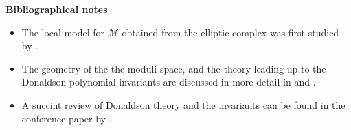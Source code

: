 \textbf{Bibliographical notes}
{\small
\begin{itemize}
	\item The local model for $\mathcal{M}$ obtained from the elliptic complex 
		was first studied by \citet{local_moduli}.
	\item The geometry of the the moduli space, and the theory leading up to the
		Donaldson polynomial invariants are
		discussed in more detail in \citet{morgan} and
		\citet{donaldson_kronheimer}. 
	\item A succint review of Donaldson theory and the invariants can be found
		in the conference paper by \citet{naber_donaldson}.
\end{itemize}
}
